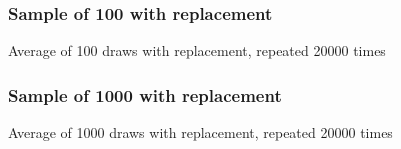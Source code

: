 \documentclass[handout]{beamer}
\begin{document}


   \begin{frame}
   \frametitle{Sample of 100 with replacement}
   \begin{center}
   \end{center}
   Average of 100 draws with replacement, repeated 20000 times
   \end{frame}



   \begin{frame}
   \frametitle{Sample of 1000 with replacement}
   \begin{center}
   \end{center}
   Average of 1000 draws with replacement, repeated 20000 times
   \end{frame}

\end{document}
